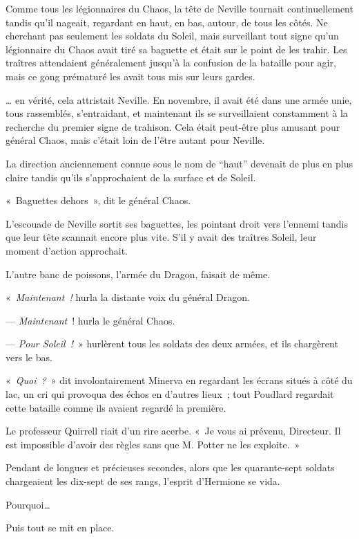 Comme tous les légionnaires du Chaos, la tête de Neville tournait continuellement tandis qu'il nageait, regardant en haut, en bas, autour, de tous les côtés. Ne cherchant pas seulement les soldats du Soleil, mais surveillant tout signe qu'un légionnaire du Chaos avait tiré sa baguette et était sur le point de les trahir. Les traîtres attendaient généralement jusqu'à la confusion de la bataille pour agir, mais ce gong prématuré les avait tous mis sur leurs gardes.

… en vérité, cela attristait Neville. En novembre, il avait été dans une armée unie, tous rassemblés, s'entraidant, et maintenant ils se surveillaient constamment à la recherche du premier signe de trahison. Cela était peut-être plus amusant pour général Chaos, mais c'était loin de l'être autant pour Neville.

La direction anciennement connue sous le nom de “haut” devenait de plus en plus claire tandis qu'ils s'approchaient de la surface et de Soleil.

«~Baguettes dehors~», dit le général Chaos.

L'escouade de Neville sortit ses baguettes, les pointant droit vers l'ennemi tandis que leur tête scannait encore plus vite. S'il y avait des traîtres Soleil, leur moment d'action approchait.

L'autre banc de poissons, l'armée du Dragon, faisait de même.

«~\emph{Maintenant~!} hurla la distante voix du général Dragon.

--- \emph{Maintenant}~! hurla le général Chaos.

--- \emph{Pour Soleil~!}~» hurlèrent tous les soldats des deux armées, et ils chargèrent vers le bas.

\later

«~\emph{Quoi~?}~» dit involontairement Minerva en regardant les écrans situés à côté du lac, un cri qui provoqua des échos en d'autres lieux~; tout Poudlard regardait cette bataille comme ils avaient regardé la première.

Le professeur Quirrell riait d'un rire acerbe. «~Je vous ai prévenu, Directeur. Il est impossible d'avoir des règles sans que M. Potter ne les exploite.~»

\later

Pendant de longues et précieuses secondes, alors que les quarante-sept soldats chargeaient les dix-sept de ses rangs, l'esprit d'Hermione se vida.

Pourquoi…

Puis tout se mit en place.


